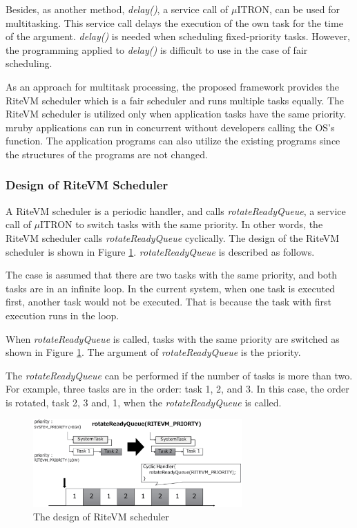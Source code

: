 \documentclass{sig-alternate-05-2015}
\begin{document}
Besides, as another method, {\it delay()}, a service call of $\mu$ITRON, can be used for multitasking.
This service call delays the execution of the own task for the time of the argument.
{\it delay()} is needed when scheduling fixed-priority tasks.
However, the programming applied to {\it delay()} is difficult to use in the case of fair scheduling.

As an approach for multitask processing, the proposed framework provides the RiteVM scheduler which is a fair scheduler and runs multiple tasks equally.
The RiteVM scheduler is utilized only when application tasks have the same priority.
mruby applications can run in concurrent without developers calling the OS's function.
The application programs can also utilize the existing programs since the structures of the programs are not changed. 

\subsubsection{Design of RiteVM Scheduler}
A RiteVM scheduler is a periodic handler, and calls {\it rotateReadyQueue}, a service call of $\mu$ITRON to switch tasks with the same priority.
In other words, the RiteVM scheduler calls {\it rotateReadyQueue} cyclically.
The design of the RiteVM scheduler is shown in Figure \ref{fig:rotateReadyQueue}. 
{\it rotateReadyQueue} is described as follows.

The case is assumed that there are two tasks with the same priority, and both tasks are in an infinite loop.
In the current system, when one task is executed first, another task would not be executed.
That is because the task with first execution runs in the loop.

When {\it rotateReadyQueue} is called, tasks with the same priority are switched as shown in Figure \ref{fig:rotateReadyQueue}.
The argument of {\it rotateReadyQueue} is the priority.

The {\it rotateReadyQueue} can be performed if the number of tasks is more than two.
For example, three tasks are in the order: task 1, 2, and 3.
In this case, the order is rotated, task 2, 3 and, 1, when the {\it rotateReadyQueue} is called.

\begin{figure}[t]
    \centering
    \includegraphics[width=8cm,clip]{figure/rotateReadyQueue.eps}
    \caption{The design of RiteVM scheduler}
    \label{fig:rotateReadyQueue}
\end{figure} 
 
\end{document}
